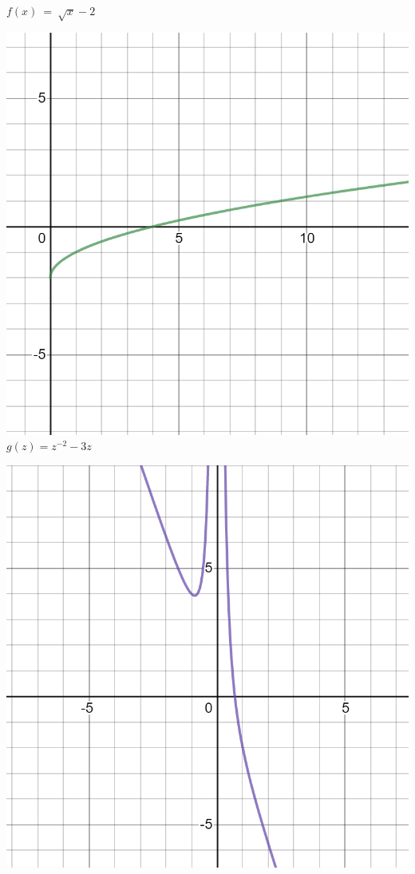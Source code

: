 \documentclass[12pt]{article}
\begin{document}
\newpage
$f\left(x\right)\ =\ \sqrt{x}-2$

\includegraphics[scale=0.25]{desmos-graph (2).png}\\

$g\left(z\right)=z^{-2}-3z$

\includegraphics[scale=0.25]{desmos-graph (3).png}\\
\end{document}
